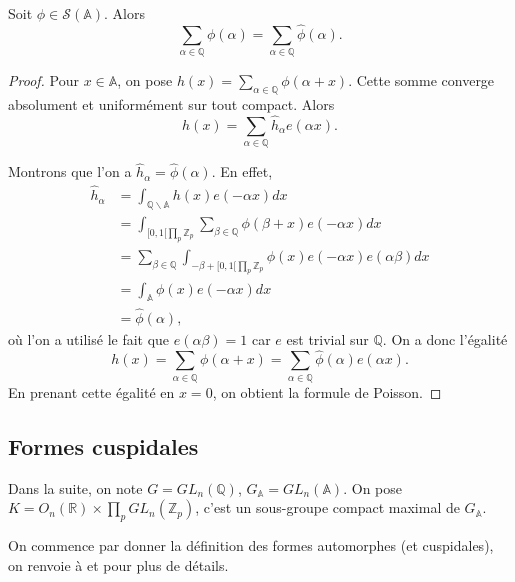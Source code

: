 \begin{proposition}
Soit $\phi \in \mathcal{S}(\mathbb{A})$. Alors
\begin{equation}
\sum_{\alpha \in \mathbb{Q}} \phi(\alpha) = \sum_{\alpha \in \mathbb{Q}} \hat{\phi}(\alpha).
\end{equation}
\end{proposition}

\begin{proof}
Pour $x \in \mathbb{A}$, on pose $h(x) = \sum_{\alpha \in \mathbb{Q}} \phi(\alpha+x)$. Cette somme converge absolument et uniformément sur tout compact. Alors
\begin{equation}
h(x) = \sum_{\alpha \in \mathbb{Q}} \hat{h}_\alpha e(\alpha x).
\end{equation}

Montrons que l'on a $\hat{h}_\alpha = \hat{\phi}(\alpha)$. En effet,
\begin{align}
\hat{h}_\alpha &= \int_{\mathbb{Q}\backslash \mathbb{A}} h(x)e(-\alpha x)dx \\
&=\int_{[0, 1[ \prod_p \mathbb{Z}_p} \sum_{\beta \in \mathbb{Q}} \phi(\beta+x)e(-\alpha x)dx \\
&= \sum_{\beta \in \mathbb{Q}}\int_{-\beta + [0, 1[ \prod_p \mathbb{Z}_p} \phi(x)e(-\alpha x)e(\alpha \beta)dx \\
&= \int_{\mathbb{A}} \phi(x) e(-\alpha x)dx \\
&= \hat{\phi}(\alpha),
\end{align}
où l'on a utilisé le fait que $e(\alpha \beta) = 1$ car $e$ est trivial sur $\mathbb{Q}$. On a donc l'égalité
\begin{equation}
h(x) = \sum_{\alpha \in \mathbb{Q}} \phi(\alpha+x) = \sum_{\alpha \in \mathbb{Q}} \hat{\phi}(\alpha) e(\alpha x).
\end{equation}
En prenant cette égalité en $x=0$, on obtient la formule de Poisson.
\end{proof}

\subsection{Formes cuspidales}
Dans la suite, on note $G = GL_n(\mathbb{Q})$, $G_\mathbb{A}=GL_n(\mathbb{A})$. On pose $K = O_n(\mathbb{R}) \times \prod_p GL_n(\mathbb{Z}_p)$, c'est un sous-groupe compact maximal de $G_\mathbb{A}$.

On commence par donner la définition des formes automorphes (et cuspidales), on renvoie à \cite{bump} et \cite{goldfeld-hundley} pour plus de détails.

